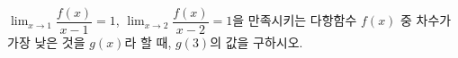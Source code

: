 $\displaystyle\lim_{x\to 1}\dfrac{f(x)}{x-1}=1$, $\displaystyle\lim_{x\to 2}\dfrac{f(x)}{x-2}=1$을 만족시키는 다항함수 $f(x)$ 중 차수가 가장 낮은 것을 $g(x)$라 할 때, $g(3)$의 값을 구하시오.

